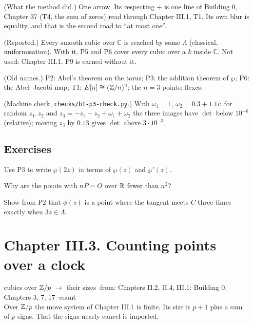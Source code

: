 \begin{lines}
\item[\lab{R1}] (What the method did.) One arrow. Its respecting $+$ is one line of Building 0, Chapter 37 (T4, the sum of zeros) read through Chapter III.1, T1. Its own blur is equality, and that is the second road to ``at most one''.
\item[\lab{R2}] (Reported.) Every smooth cubic over $\mathbb{C}$ is reached by some $\Lambda$ (classical, uniformisation). With it, P5 and P6 cover every cubic over a $k$ inside $\mathbb{C}$. Not used: Chapter III.1, P9 is earned without it.
\item[\lab{R3}] (Old names.) P2: Abel's theorem on the torus; P3: the addition theorem of $\wp$; P6: the Abel--Jacobi map; T1: $E[n] \cong (\mathbb{Z}/n)^2$; the $n = 3$ points: flexes.
\item[\lab{R4}] (Machine check, \texttt{checks/b1-p3-check.py}.) With $\omega_1 = 1$, $\omega_2 = 0.3 + 1.1i$: for random $z_1, z_2$ and $z_3 = -z_1 - z_2 + \omega_1 + \omega_2$ the three images have $\det$ below $10^{-6}$ (relative); moving $z_3$ by $0.13$ gives $\det$ above $3 \cdot 10^{-3}$.
\end{lines}

\subsection*{Exercises}

\begin{lines}
\item[\lab{E1}] Use P3 to write $\wp(2z)$ in terms of $\wp(z)$ and $\wp'(z)$.
\item[\lab{E2}] Why are the points with $nP = O$ over $\mathbb{R}$ fewer than $n^2$?
\item[\lab{E3}] Show from P2 that $\phi(z)$ is a point where the tangent meets $C$ three times exactly when $3z \in \Lambda$.
\end{lines}

\newpage

\section*{Chapter III.3. Counting points over a clock}
\begin{center}
{\normalsize cubics over $\mathbb{Z}/p$ $\to$ their sizes \quad$\cdot$\quad from: Chapters II.2, II.4, III.1; Building 0, Chapters 3, 7, 17 \quad$\cdot$\quad count}\\[4pt]
{\small Over $\mathbb{Z}/p$ the move system of Chapter III.1 is finite. Its size is $p + 1$ plus a sum of $p$ signs. That the signs nearly cancel is imported.}
\end{center}

